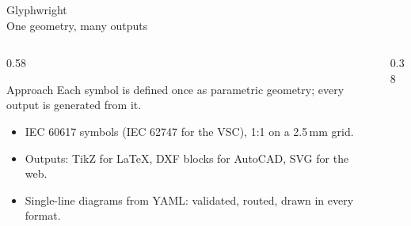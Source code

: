 

\newcommand{\slfig}[1]{}

\begin{frame}{Glyphwright\\One geometry, many outputs}
  \begin{columns}[T,onlytextwidth]
    \begin{column}{0.58\textwidth}
      \begin{block}{Approach}
        Each symbol is defined once as parametric geometry; every output is generated from it.
      \end{block}
      \vspace{0.3em}
      \begin{itemize}
        \setlength{\itemsep}{0.4em}
        \item IEC 60617 symbols (IEC 62747 for the VSC), 1:1 on a 2.5\,mm grid.
        \item Outputs: TikZ for LaTeX, DXF blocks for AutoCAD, SVG for the web.
        \item Single-line diagrams from YAML: validated, routed, drawn in every format.
      \end{itemize}
    \end{column}
    \begin{column}{0.38\textwidth}
      \centering
      \slfig{overview}
    \end{column}
  \end{columns}
\end{frame}


